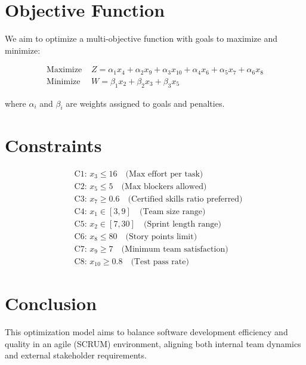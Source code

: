 \documentclass{article}
\begin{document}
\section*{Objective Function}
We aim to optimize a multi-objective function with goals to maximize and minimize:

\begin{align*}
\text{Maximize } & Z = \alpha_1 x_4 + \alpha_2 x_9 + \alpha_3 x_{10} + \alpha_4 x_6 + \alpha_5 x_7 + \alpha_6 x_8 \\
\text{Minimize } & W = \beta_1 x_2 + \beta_2 x_3 + \beta_3 x_5
\end{align*}

where $\alpha_i$ and $\beta_i$ are weights assigned to goals and penalties.

\section*{Constraints}
\begin{align*}
& \text{C1: } x_3 \leq 16 \quad \text{(Max effort per task)} \\
& \text{C2: } x_5 \leq 5 \quad \text{(Max blockers allowed)} \\
& \text{C3: } x_7 \geq 0.6 \quad \text{(Certified skills ratio preferred)} \\
& \text{C4: } x_1 \in [3,9] \quad \text{(Team size range)} \\
& \text{C5: } x_2 \in [7,30] \quad \text{(Sprint length range)} \\
& \text{C6: } x_8 \leq 80 \quad \text{(Story points limit)} \\
& \text{C7: } x_9 \geq 7 \quad \text{(Minimum team satisfaction)} \\
& \text{C8: } x_{10} \geq 0.8 \quad \text{(Test pass rate)}
\end{align*}

\section*{Conclusion}
This optimization model aims to balance software development efficiency and quality in an agile (SCRUM) environment, aligning both internal team dynamics and external stakeholder requirements.
\end{document}
